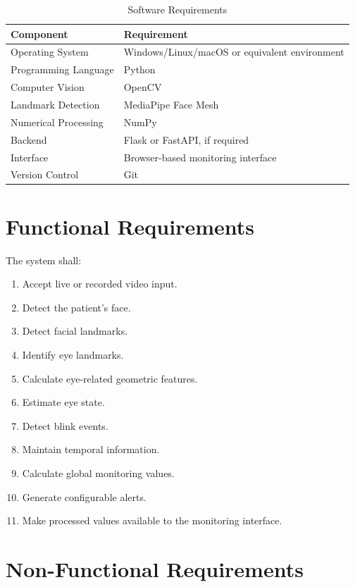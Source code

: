 \documentclass[12pt]{tietreport}
\begin{document}
\begin{table}[H]
\centering
\caption{Software Requirements}
\begin{tabular}{p{}p{}}
\toprule
\textbf{Component} & \textbf{Requirement} \\
\midrule
Operating System & Windows/Linux/macOS or equivalent environment \\
Programming Language & Python \\
Computer Vision & OpenCV \\
Landmark Detection & MediaPipe Face Mesh \\
Numerical Processing & NumPy \\
Backend & Flask or FastAPI, if required \\
Interface & Browser-based monitoring interface \\
Version Control & Git \\
\bottomrule
\end{tabular}
\end{table}

\section{Functional Requirements}

The system shall:

\begin{enumerate}[leftmargin=*]
    \item Accept live or recorded video input.
    \item Detect the patient's face.
    \item Detect facial landmarks.
    \item Identify eye landmarks.
    \item Calculate eye-related geometric features.
    \item Estimate eye state.
    \item Detect blink events.
    \item Maintain temporal information.
    \item Calculate global monitoring values.
    \item Generate configurable alerts.
    \item Make processed values available to the monitoring interface.
\end{enumerate}

\section{Non-Functional Requirements}
\end{document}
